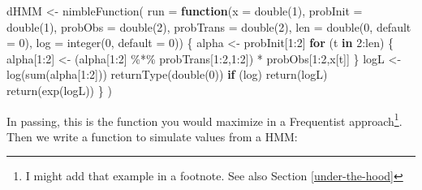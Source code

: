 \documentclass[
  12pt,
]{krantz}
\newenvironment{Shaded}{\begin{snugshade}}{\end{snugshade}}
\newcommand{\AttributeTok}[1]{\textcolor[rgb]{0.77,0.63,0.00}{#1}}
\newcommand{\ControlFlowTok}[1]{\textcolor[rgb]{0.13,0.29,0.53}{\textbf{#1}}}
\newcommand{\DecValTok}[1]{\textcolor[rgb]{0.00,0.00,0.81}{#1}}
\newcommand{\FunctionTok}[1]{\textcolor[rgb]{0.00,0.00,0.00}{#1}}
\newcommand{\NormalTok}[1]{#1}
\newcommand{\OtherTok}[1]{\textcolor[rgb]{0.56,0.35,0.01}{#1}}
\newcommand{\SpecialCharTok}[1]{\textcolor[rgb]{0.00,0.00,0.00}{#1}}
\begin{document}
\begin{Shaded}
\begin{Highlighting}[]
\NormalTok{dHMM }\OtherTok{\textless{}{-}} \FunctionTok{nimbleFunction}\NormalTok{(}
  \AttributeTok{run =} \ControlFlowTok{function}\NormalTok{(}\AttributeTok{x =} \FunctionTok{double}\NormalTok{(}\DecValTok{1}\NormalTok{), }
                 \AttributeTok{probInit =} \FunctionTok{double}\NormalTok{(}\DecValTok{1}\NormalTok{),}
                 \AttributeTok{probObs =} \FunctionTok{double}\NormalTok{(}\DecValTok{2}\NormalTok{),}
                 \AttributeTok{probTrans =} \FunctionTok{double}\NormalTok{(}\DecValTok{2}\NormalTok{),}
                 \AttributeTok{len =} \FunctionTok{double}\NormalTok{(}\DecValTok{0}\NormalTok{, }\AttributeTok{default =} \DecValTok{0}\NormalTok{),}
                 \AttributeTok{log =} \FunctionTok{integer}\NormalTok{(}\DecValTok{0}\NormalTok{, }\AttributeTok{default =} \DecValTok{0}\NormalTok{)) \{}
\NormalTok{    alpha }\OtherTok{\textless{}{-}}\NormalTok{ probInit[}\DecValTok{1}\SpecialCharTok{:}\DecValTok{2}\NormalTok{]}
    \ControlFlowTok{for}\NormalTok{ (t }\ControlFlowTok{in} \DecValTok{2}\SpecialCharTok{:}\NormalTok{len) \{}
\NormalTok{      alpha[}\DecValTok{1}\SpecialCharTok{:}\DecValTok{2}\NormalTok{] }\OtherTok{\textless{}{-}}\NormalTok{ (alpha[}\DecValTok{1}\SpecialCharTok{:}\DecValTok{2}\NormalTok{] }\SpecialCharTok{\%*\%}\NormalTok{ probTrans[}\DecValTok{1}\SpecialCharTok{:}\DecValTok{2}\NormalTok{,}\DecValTok{1}\SpecialCharTok{:}\DecValTok{2}\NormalTok{]) }\SpecialCharTok{*}\NormalTok{ probObs[}\DecValTok{1}\SpecialCharTok{:}\DecValTok{2}\NormalTok{,x[t]]}
\NormalTok{    \}}
\NormalTok{    logL }\OtherTok{\textless{}{-}} \FunctionTok{log}\NormalTok{(}\FunctionTok{sum}\NormalTok{(alpha[}\DecValTok{1}\SpecialCharTok{:}\DecValTok{2}\NormalTok{]))}
    \FunctionTok{returnType}\NormalTok{(}\FunctionTok{double}\NormalTok{(}\DecValTok{0}\NormalTok{))}
    \ControlFlowTok{if}\NormalTok{ (log) }\FunctionTok{return}\NormalTok{(logL)}
    \FunctionTok{return}\NormalTok{(}\FunctionTok{exp}\NormalTok{(logL))}
\NormalTok{  \}}
\NormalTok{)}
\end{Highlighting}
\end{Shaded}

In passing, this is the function you would maximize in a Frequentist approach\footnote{I might add that example in a footnote. See also Section \ref{under-the-hood}}. Then we write a function to simulate values from a HMM:
\end{document}
